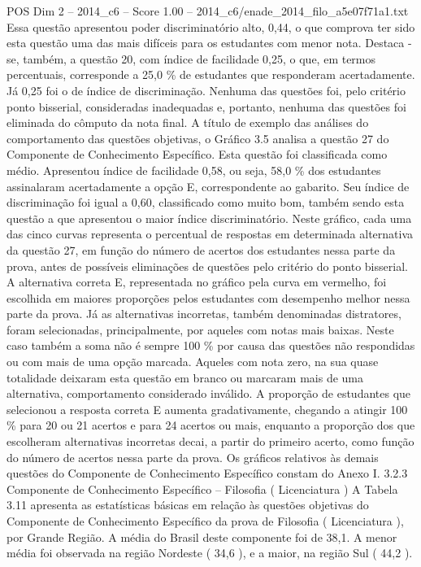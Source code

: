 \begin{textsample}{POS Dim 2 – 2014\_c6 – Score 1.00 – 2014\_c6/enade\_2014\_filo\_a5e07f71a1.txt}
Essa questão apresentou poder discriminatório alto, 0,44, o que comprova ter sido esta questão uma das mais difíceis para os estudantes com menor nota.
Destaca -se, também, a questão 20, com índice de facilidade 0,25, o que, em termos percentuais, corresponde a 25,0 \% de estudantes que responderam acertadamente.
Já 0,25 foi o de índice de discriminação.
Nenhuma das questões foi, pelo critério ponto bisserial, consideradas inadequadas e, portanto, nenhuma das questões foi eliminada do cômputo da nota final.
A título de exemplo das análises do comportamento das questões objetivas, o Gráfico 3.5 analisa a questão 27 do Componente de Conhecimento Específico.
Esta questão foi classificada como médio.
Apresentou índice de facilidade 0,58, ou seja, 58,0 \% dos estudantes assinalaram acertadamente a opção E, correspondente ao gabarito.
Seu índice de discriminação foi igual a 0,60, classificado como muito bom, também sendo esta questão a que apresentou o maior índice discriminatório.
Neste gráfico, cada uma das cinco curvas representa o percentual de respostas em determinada alternativa da questão 27, em função do número de acertos dos estudantes nessa parte da prova, antes de possíveis eliminações de questões pelo critério do ponto bisserial.
A alternativa correta E, representada no gráfico pela curva em vermelho, foi escolhida em maiores proporções pelos estudantes com desempenho melhor nessa parte da prova.
Já as alternativas incorretas, também denominadas distratores, foram selecionadas, principalmente, por aqueles com notas mais baixas.
Neste caso também a soma não é sempre 100 \% por causa das questões não respondidas ou com mais de uma opção marcada.
Aqueles com nota zero, na sua quase totalidade deixaram esta questão em branco ou marcaram mais de uma alternativa, comportamento considerado inválido.
A proporção de estudantes que selecionou a resposta correta E aumenta gradativamente, chegando a atingir 100 \% para 20 ou 21 acertos e para 24 acertos ou mais, enquanto a proporção dos que escolheram alternativas incorretas decai, a partir do primeiro acerto, como função do número de acertos nessa parte da prova.
Os gráficos relativos às demais questões do Componente de Conhecimento Específico constam do Anexo I. 3.2.3 Componente de Conhecimento Específico – Filosofia ( Licenciatura ) A Tabela 3.11 apresenta as estatísticas básicas em relação às questões objetivas do Componente de Conhecimento Específico da prova de Filosofia ( Licenciatura ), por Grande Região.
A média do Brasil deste componente foi de 38,1.
A menor média foi observada na região Nordeste ( 34,6 ), e a maior, na região Sul ( 44,2 ).

\end{textsample}
